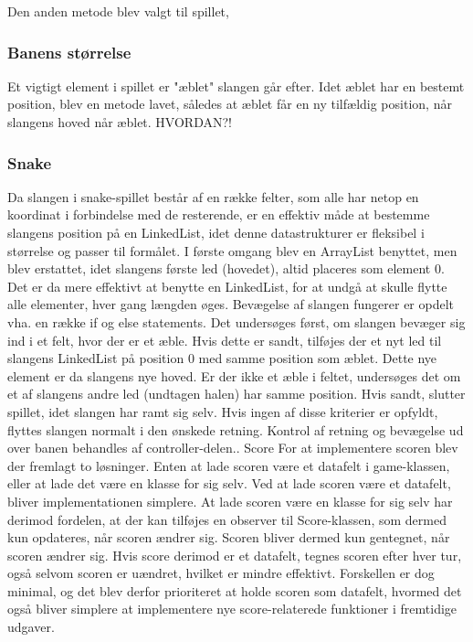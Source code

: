 Den anden metode blev valgt til spillet,

\subsubsection{Banens størrelse}

Et vigtigt element i spillet er "æblet" slangen går efter. Idet æblet har en bestemt position, blev en metode lavet, således at æblet får en ny tilfældig position, når slangens hoved når æblet. HVORDAN?!

\subsubsection{Snake}

Da slangen i snake-spillet består af en række felter, som alle har netop en koordinat i forbindelse med de resterende, er en effektiv måde at bestemme slangens position på en LinkedList, idet denne datastrukturer er fleksibel i størrelse og passer til formålet. I første omgang blev en ArrayList benyttet, men blev erstattet, idet slangens første led (hovedet), altid placeres som element 0. Det er da mere effektivt at benytte en LinkedList, for at undgå at skulle flytte alle elementer, hver gang længden øges.
Bevægelse af slangen fungerer er opdelt vha. en række if og else statements. Det undersøges først, om slangen bevæger sig ind i et felt, hvor der er et æble. Hvis dette er sandt, tilføjes der et nyt led til slangens LinkedList på position 0 med samme position som æblet. Dette nye element er da slangens nye hoved. Er der ikke et æble i feltet, undersøges det om et af slangens andre led (undtagen halen) har samme position. Hvis sandt, slutter spillet, idet slangen har ramt sig selv. Hvis ingen af disse kriterier er opfyldt, flyttes slangen normalt i den ønskede retning. Kontrol af retning og bevægelse ud over banen behandles af controller-delen..
Score
For at implementere scoren blev der fremlagt to løsninger. Enten at lade scoren være et datafelt i game-klassen, eller at lade det være en klasse for sig selv. Ved at lade scoren være et datafelt, bliver implementationen simplere. At lade scoren være en klasse for sig selv har derimod fordelen, at der kan 
tilføjes en observer til Score-klassen, som dermed kun opdateres, når scoren ændrer sig. Scoren bliver dermed kun gentegnet, når scoren ændrer sig. Hvis score derimod er et datafelt, tegnes scoren efter hver tur, også selvom scoren er uændret, hvilket er mindre effektivt. Forskellen er dog minimal, og det blev derfor prioriteret at holde scoren som datafelt, hvormed det også bliver simplere at implementere nye score-relaterede funktioner i fremtidige udgaver.


